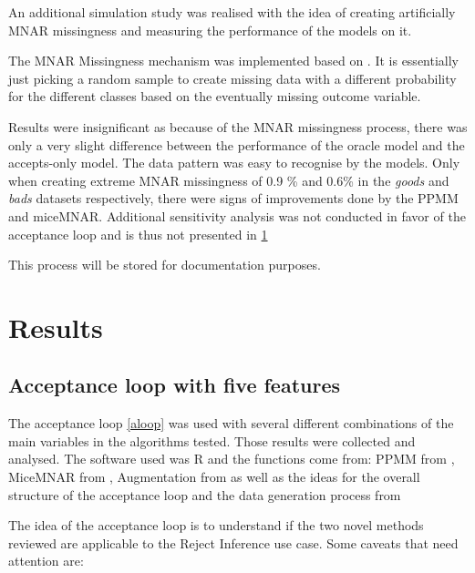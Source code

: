 \documentclass[11pt,a4paper]{article}
\begin{document}
An additional simulation study was realised with the idea of creating artificially MNAR missingness and measuring the performance of the models on it. 

The MNAR Missingness mechanism was implemented based on \cite{zhang2023generate}. It is essentially just picking a random sample to create missing data with a different probability for the different classes based on the eventually missing outcome variable.

Results were insignificant as because of the MNAR missingness process, there was only a very slight difference between the performance of the oracle model and the accepts-only model. The data pattern was easy to recognise by the models. Only when creating extreme MNAR missingness of 0.9 \% and 0.6\% in the \textit{goods} and \textit{bads} datasets respectively, there were signs of improvements done by the PPMM and miceMNAR. Additional sensitivity analysis was not conducted in favor of the acceptance loop and is thus not presented in \ref{results}

This process will be stored for documentation purposes.



\section{Results} \label{results}


\newcommand{\rowData}[5]{$\mu^g$: #1, $\mu^b$: #2, $\alpha$: #3, $b$:#4, $\phi$: #5}



\subsection{Acceptance loop with five features}

The acceptance loop \ref{aloop} was used with several different combinations of the main variables in the algorithms tested. Those results were collected and analysed. The software used was R and the functions come from: 
PPMM from \cite{Andridge_Little_2020}, MiceMNAR from \cite{galimard_heckman_2018}, Augmentation from \cite{ehrhardt_reject_2021} as well as the ideas for the overall structure of the acceptance loop and the data generation process from \cite{kozodoi_unpublished} 

The idea of the acceptance loop is to understand if the two novel methods reviewed are applicable to the Reject Inference use case. Some caveats that need attention are:
\end{document}
